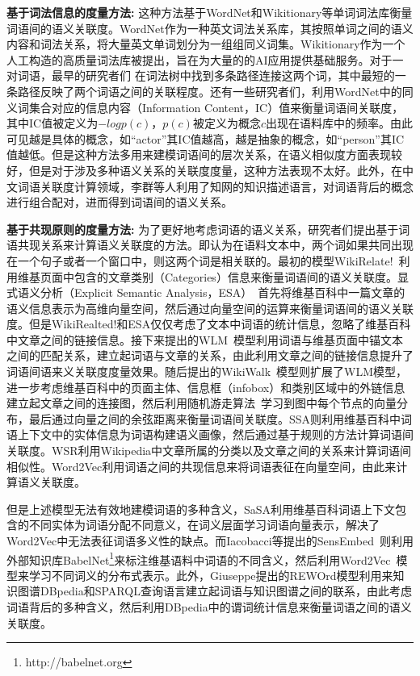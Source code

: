 \textbf{基于词法信息的度量方法:}
这种方法基于WordNet和Wikitionary等单词词法库衡量词语间的语义关联度。WordNet作为一种英文词法关系库，其按照单词之间的语义内容和词法关系，将大量英文单词划分为一组组同义词集。Wikitionary\cite{aaai/ZeschMG08}作为一个人工构造的高质量词法库被提出，旨在为大量的的AI应用提供基础服务。对于一对词语，最早的研究者们\cite{its/Rada89, Leacock98, wu1994verb, tkde/LiBM03} 在词法树中找到多条路径连接这两个词，其中最短的一条路径反映了两个词语之间的关联程度。还有一些研究者们，利用WordNet中的同义词集合对应的信息内容（Information Content，IC）值来衡量词语间关联度\cite{ijcai/Resnik95, RCLIC/Jiang97, icml/Lin98}，其中IC值被定义为$-log p(c)$，$p(c)$被定义为概念$c$出现在语料库中的频率。由此可见越是具体的概念，如“actor”其IC值越高，越是抽象的概念，如“person”其IC值越低。但是这种方法多用来建模词语间的层次关系，在语义相似度方面表现较好，但是对于涉及多种语义关系的关联度度量，这种方法表现不太好。此外，在中文词语关联度计算领域，李群等人\cite{liqun2002}利用了知网的知识描述语言，对词语背后的概念进行组合配对，进而得到词语间的语义关系。

\textbf{基于共现原则的度量方法:}
为了更好地考虑词语的语义关系，研究者们提出基于词语共现关系来计算语义关联度的方法。即认为在语料文本中，两个词如果共同出现在一个句子或者一个窗口中，则这两个词是相关联的。最初的模型WikiRelate!~\cite{aaai/StrubeP06}利用维基页面中包含的文章类别（Categories）信息来衡量词语间的语义关联度。显式语义分析（Explicit Semantic Analysis，ESA）~\cite{ijcai/GabrilovichM07}首先将维基百科中一篇文章的语义信息表示为高维向量空间，然后通过向量空间的运算来衡量词语间的语义关联度。但是WikiRealted!和ESA仅仅考虑了文本中词语的统计信息，忽略了维基百科中文章之间的链接信息。接下来提出的WLM~\cite{aaai/Milne08}模型利用词语与维基页面中锚文本之间的匹配关系，建立起词语与文章的关系，由此利用文章之间的链接信息提升了词语间语来义关联度度量效果。随后提出的WikiWalk~\cite{textgraphs/YehRMAS09}模型则扩展了WLM模型，进一步考虑维基百科中的页面主体、信息框（infobox）和类别区域中的外链信息建立起文章之间的连接图，然后利用随机游走算法~\cite{emnlp/HughesR07}学习到图中每个节点的向量分布，最后通过向量之间的余弦距离来衡量词语间关联度。SSA\cite{aaai/HassanM11}则利用维基百科中词语上下文中的实体信息为词语构建语义画像，然后通过基于规则的方法计算词语间关联度。WSR\cite{sunchenchen2012}利用Wikipedia中文章所属的分类以及文章之间的关系来计算词语间相似性。Word2Vec\cite{corr/Mikolov13}利用词语之间的共现信息来将词语表征在向量空间，由此来计算语义关联度。

但是上述模型无法有效地建模词语的多种含义，SaSA\cite{aaai/WuG15}利用维基百科词语上下文包含的不同实体为词语分配不同意义，在词义层面学习词语向量表示，解决了Word2Vec中无法表征词语多义性的缺点。而Iacobacci等提出的SensEmbed~\cite{acl/IacobacciPN15}则利用外部知识库BabelNet\footnote{http://babelnet.org}来标注维基语料中词语的不同含义，然后利用Word2Vec~\cite{corr/Mikolov13}模型来学习不同词义的分布式表示。此外，Giuseppe提出的REWOrd模型利用来知识图谱DBpedia和SPARQL查询语言建立起词语与知识图谱之间的联系，由此考虑词语背后的多种含义，然后利用DBpedia中的谓词统计信息来衡量词语之间的语义关联度。

